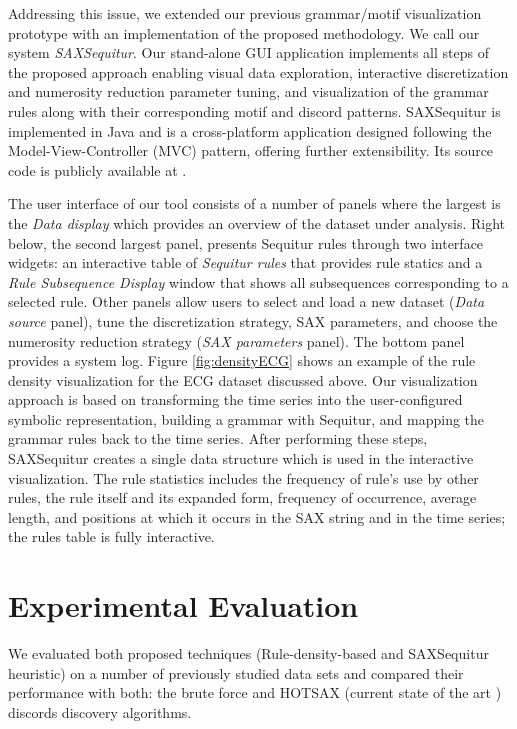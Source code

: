 \documentclass{llncs}
\begin{document}
Addressing this issue, we extended our previous grammar/motif visualization prototype with an implementation of the proposed methodology. We call our system \textit{SAXSequitur}. Our stand-alone GUI application implements all steps of the proposed approach enabling visual data exploration, interactive discretization and numerosity reduction parameter tuning, and visualization of the grammar rules along with their corresponding motif and discord patterns. SAXSequitur is implemented in Java and is a cross-platform application designed following the Model-View-Controller (MVC) pattern, offering further extensibility. Its source code is publicly available at \cite{jmotif}.

The user interface of our tool consists of a number of panels where the largest is the \textit{Data display} which provides an overview of the dataset under analysis. Right below, the second largest panel, presents Sequitur rules through two interface widgets: an interactive table of \textit{Sequitur rules} that provides rule statics and a \textit{Rule Subsequence Display} window that shows all subsequences corresponding to a selected rule. Other panels allow users to select and load a new dataset (\textit{Data source} panel), tune the discretization strategy, SAX parameters, and choose the numerosity reduction strategy (\textit{SAX parameters} panel). The bottom panel provides a system log. Figure \ref{fig:densityECG} shows an example of the rule density visualization for the ECG dataset discussed above.
Our visualization approach is based on transforming the time series into the user-configured symbolic representation, building a grammar with Sequitur, and mapping the grammar rules back to the time series. After performing these steps, SAXSequitur creates a single data structure which is used in the interactive visualization. The rule statistics includes the frequency of rule's  use by other rules, the rule itself and its expanded form, frequency of occurrence, average length, and positions at which it occurs in the SAX string and in the time series; the rules table is fully interactive. 

\section{Experimental Evaluation}
We evaluated both proposed techniques (Rule-density-based and SAXSequitur heuristic) on a number of previously studied data sets and compared their performance with both: the brute force and HOTSAX (current state of the art \cite{chan_anomaly}) discords discovery algorithms. 
\end{document}

